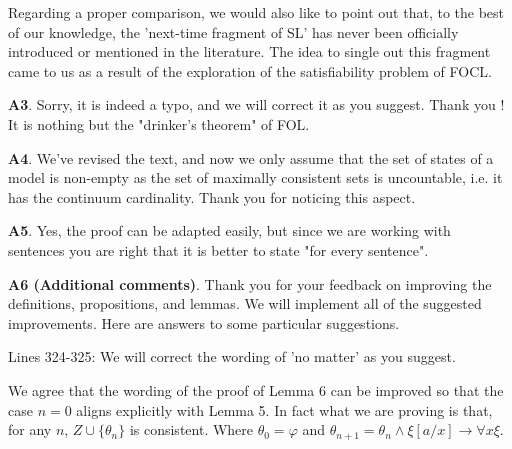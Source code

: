 \documentclass{article}
\begin{document}
Regarding a proper comparison, we would also like to point out that, to the best of our knowledge, the 'next-time fragment of SL' has never been officially introduced or mentioned in the literature. The idea to single out this fragment came to us as a result of the exploration of the satisfiability problem of FOCL.


\textbf{A3}. Sorry, it is indeed a typo, and we will correct it as you suggest. Thank you ! It is nothing but the "drinker's theorem" of FOL. 


\textbf{A4}. We’ve revised the text, and now we only assume that the set of states of a model is non-empty as the set of maximally consistent sets is uncountable, i.e. it has the continuum cardinality. Thank you for noticing this aspect. 


\textbf{A5}. Yes, the proof can be adapted easily, but since we are working with sentences you are right that it is better to state "for every sentence". 


\textbf{A6 (Additional comments)}. 
Thank you for your feedback on improving the definitions, propositions, and lemmas. We will implement all of the suggested improvements. Here are answers to some particular suggestions. 

Lines 324-325: We will correct the wording of 'no matter' as you suggest. %

We agree that the wording of the proof of Lemma 6 can be improved so that the case $n=0$ aligns explicitly with Lemma 5. In fact what we are proving is that, for any $n$, $Z\cup \{\theta_n\}$ is consistent. Where $\theta_0=\varphi$  and $\theta_{n+1}= \theta_n \land \xi[a/x]\to \forall x \xi $.
\end{document}
